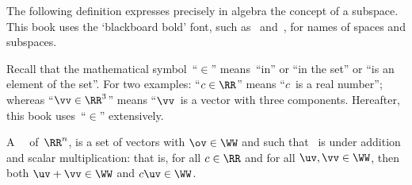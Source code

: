 The following definition expresses precisely in algebra the concept of a subspace.
This book uses the `blackboard bold' font, such as \WW\ and~\RR, for names of spaces and subspaces.

Recall that the mathematical symbol~``\(\in\)''\index{$\in$} means~``in'' or ``in the set'' or ``is an element of the set''.
For two examples: ``\(c\in\RR\)'' means ``\(c\)~is a real number''; whereas ``\(\vv\in\RR^3\)'' means ``\(\vv\)~is a vector with three components.
Hereafter, this book uses~``\(\in\)'' extensively.


\begin{definition} \label{def:subspace} 
A ~\WW\ of~\(\RR^n\),  is a set of vectors with \(\ov\in\WW\) and such that \WW\ is  under addition and scalar multiplication: that is, for all \(c\in\RR\) and for all \(\uv,\vv\in\WW\), then both \(\uv+\vv\in\WW\) and \(c\uv\in\WW\).
\end{definition}


